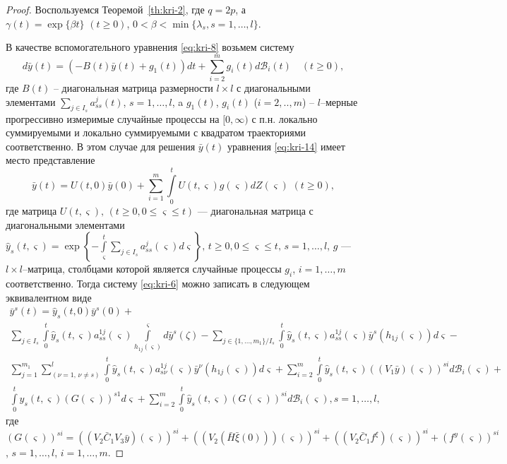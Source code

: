 \begin{proof}
    Воспользуемся Теоремой~\ref{th:kri-2}, где $q = 2p$, а
    $\gamma (t) = \exp \{\beta t\} \,\, (t \geq 0)$, $0< \beta < \min
    \{\lambda _s, s = 1, \dots, l \}$.
    
    В качестве вспомогательного уравнения \eqref{eq:kri-8} возьмем систему
    \begin{equation}
        \label{eq:kri-14}
         d \bar y(t) =  (- B(t)\bar  y(t) + g_1(t))dt+\sum
        \limits_{i=2}^{m}g_i(t)d\mathcal
        B_i(t) \quad (t \ge 0),
    \end{equation}
    где $B(t)$ -- диагональная матрица размерности $l\times l$ с
    диагональными элементами $ \sum \limits_{j\in I_s}a^{j}_{ss}(t)$, $s
    = 1,\dots,l$, a $g_1(t)$, $g_i(t)$ ($i=2,..,m$) -- $l$--мерные
    прогрессивно измеримые случайные процессы на $[0, \infty )$ с п.н.
    локально суммируемыми и локально суммируемыми с квадратом
    траекториями соответственно. В этом случае для решения $\bar y(t)$
    уравнения \eqref{eq:kri-14}  имеет место представление
    $$
     \bar y(t) = U(t,0) \bar y(0) + \sum \limits_{i=1}^{m}\int \limits _0^t
     U(t,\varsigma)g(\varsigma)dZ(\varsigma) \,\, (t \geq 0),
    $$
    где  матрица $U(t, \varsigma), \, (t \ge 0, 0 \leq \varsigma \leq
    t)$ --- диагональная матрица с диагональными элементами $ \hat y_s(t
    ,\varsigma) =\exp\left \{-\int \limits _\varsigma^t\sum
    \limits_{j\in I_s}a^{j}_{ss}(\varsigma)d\varsigma \right \}, \, t
    \ge 0, 0 \leq \varsigma \leq t, \, s = 1, \dots, l$, $g$ --- $l\times
    l$--матрица, столбцами которой является случайные процессы $g_i$, $i
    = 1, \dots, m$ соответственно. Тогда систему \eqref{eq:kri-6} можно записать в
    следующем эквивалентном виде
    \begin{multline}
        \label{eq:kri-15}
        \bar y^s(t) = \hat y_s(t,0 )\bar y^s(0) +\\
         \sum \limits_{j \in
        I_s}\int \limits _0^t \hat y_s(t,\varsigma) a^{1j}_{ss}(\varsigma
        )\int \limits _{h_{1j}(\varsigma )}^\varsigma d \bar y^s(\zeta) -
        \sum \limits_{j \in\{1,\dots,m_1\} / I_s} \int \limits _0^t \hat
        y_s(t,\varsigma) a^{1j}_{ss}(\varsigma ) \bar y^s(h_{1j}(\varsigma
        ))d\varsigma  - \\
        \sum \limits_{j=1}^{m_1}\sum \limits_{(\nu=1,\, \nu \neq s)}^{l}\int
        \limits _0^t \hat y_s(t,\varsigma) a^{1j}_{s\nu}(\varsigma ) \bar
        y^\nu(h_{1j}(\varsigma ))d\varsigma  +
         \sum \limits_{i=2}^{m} \int \limits _0^t
        \hat y_s(t,\varsigma)((V_1\bar y)(\varsigma))^{si}d\mathcal
        B_i(\varsigma) + \\
        \int \limits _0^t \hat y_s(t,\varsigma)(G(\varsigma))^{s1}
        d\varsigma + \sum \limits_{i=2}^{m} \int \limits _0^t \hat
        y_s(t,\varsigma) (G(\varsigma))^{si} d\mathcal B_i(\varsigma), s =
        1, \dots , l,
    \end{multline}
    где $(G(\varsigma))^{si}  = ((V_2\bar C_1V_3\bar y)(\varsigma))^{si}
    + ((V_2(\bar H \bar \xi(0)))(\varsigma))^{si}+ ((V_2 \bar C_1
    f^\xi)(\varsigma))^{si} + (f^y(\varsigma))^{si}$, $s = 1, \dots , l$, $i
    = 1, \dots , m$.
    

\end{proof}

